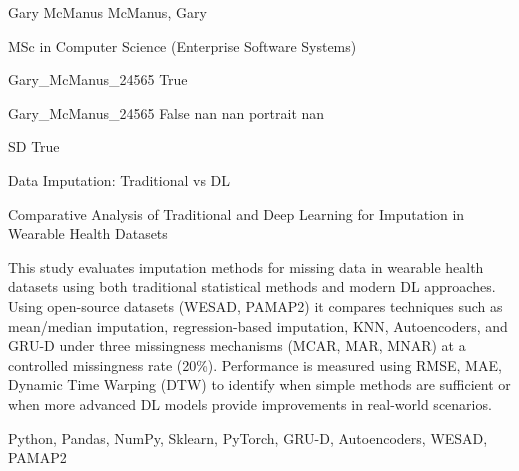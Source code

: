 
\begingroup{}\relax



\def\Key{Gary_McManus_24565}

{Gary McManus}
{McManus, Gary}

{MSc in Computer Science (Enterprise Software Systems)}

{Gary_McManus_24565}
{True}

{Gary_McManus_24565}
{False}
{nan}
{nan}
{portrait}
{nan}

{SD}
{True}

{Data Imputation: Traditional vs DL}

{Comparative Analysis of Traditional and Deep Learning for Imputation in Wearable Health Datasets}

{This study evaluates imputation methods for missing data in wearable health datasets using both traditional statistical methods and modern DL approaches. Using open-source datasets (WESAD, PAMAP2) it compares techniques such as mean/median imputation, regression-based imputation, KNN, Autoencoders, and GRU-D under three missingness mechanisms (MCAR, MAR, MNAR) at a controlled missingness rate (20\%). Performance is measured using RMSE, MAE, Dynamic Time Warping (DTW) to identify when simple methods are sufficient or when more advanced DL models provide improvements in real-world scenarios.}

{Python, Pandas, NumPy, Sklearn, PyTorch, GRU-D, Autoencoders, WESAD, PAMAP2}

